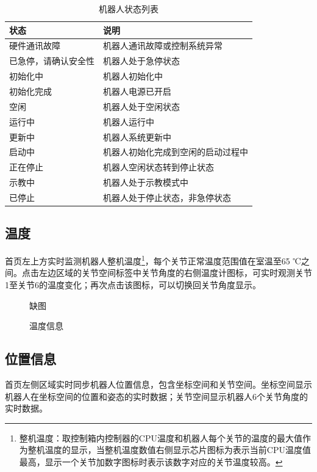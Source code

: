 \begin{table}[ht]
    \centering
    \begin{tabular}{|l|l|}\hline
\bf 状态 & \bf 说明\\\hline
硬件通讯故障 & 机器人通讯故障或控制系统异常\\\hline
已急停，请确认安全性 & 机器人处于急停状态\\\hline
初始化中 & 机器人初始化中\\\hline
初始化完成 & 机器人电源已开启\\\hline
空闲 & 机器人处于空闲状态\\\hline
运行中 & 机器人运行中\\\hline
更新中 & 机器人系统更新中\\\hline
启动中 & 机器人初始化完成到空闲的启动过程中\\\hline
正在停止 & 机器人空闲状态转到停止状态\\\hline
示教中 & 机器人处于示教模式中\\\hline
已停止 & 机器人处于停止状态，非急停状态\\\hline
    \end{tabular}
    \caption{机器人状态列表}
\end{table}

\subsection{温度}
\LM 首页左上方实时监测机器人整机温度\footnote{整机温度：取控制箱内控制器的CPU温度和机器人每个关节的温度的最大值作为整机温度的显示，当整机温度数值右侧显示芯片图标为表示当前CPU温度值最高，显示一个关节加数字图标时表示该数字对应的关节温度较高。}，每个关节正常温度范围值在室温至65 ℃之间。点击左边区域的关节空间标签中关节角度的右侧温度计图标，可实时观测关节1至关节6的温度变化；再次点击该图标，可以切换回关节角度显示。

\begin{figure}[ht]
	\centering
	\color{red}缺图
	\caption{温度信息}
	\label{fig:温度信息}
\end{figure}


\subsection{位置信息}
\LM 首页左侧区域实时同步机器人位置信息，包含坐标空间和关节空间。坐标空间显示机器人在坐标空间的位置和姿态的实时数据；关节空间显示机器人6个关节角度的实时数据。

